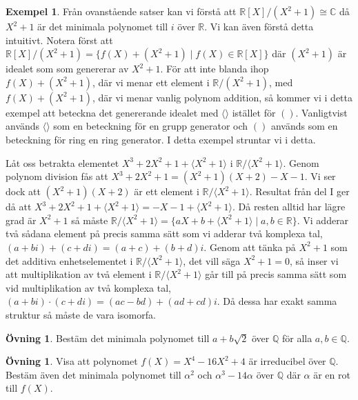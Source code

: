 \documentclass{article}
\theoremstyle{definition}
\newtheorem{ovning}[thm]{Övning}
\newtheorem{exmp}[thm]{Exempel}
\begin{document}
\begin{exmp}
  Från ovanstående satser kan vi förstå att $\mathbb{R}[X]/(X^2+1) \cong \mathbb{C}$ då $X^2 + 1$ är det minimala polynomet till $i$ över $\mathbb{R}$.
  Vi kan även förstå detta intuitivt. Notera först att $\mathbb{R}[X]/(X^2+1) = \{f(X) + (X^2 + 1) \; | \; f(X) \in \mathbb{R}[X]\}$
  där $(X^2 + 1)$ är idealet som som genererar av $X^2 + 1$. För att inte blanda ihop $f(X) + (X^2 + 1)$, där vi menar ett element i 
  $\mathbb{R}/(X^2 + 1)$, med $f(X) + (X^2 + 1)$, där vi menar vanlig polynom addition, så kommer vi 
  i detta exempel att beteckna det genererande idealet med $\langle \rangle$ istället för $()$. Vanligtvist används $\langle \rangle$
  som en beteckning för en grupp generator och $()$ används som en beteckning för ring en ring generator. I detta exempel 
  struntar vi i detta. 

  Låt oss betrakta elementet $X^3 + 2X^2 + 1 + \langle X^2 + 1 \rangle$ i $\mathbb{R}/ \langle X^2 + 1 \rangle$. Genom 
  polynom division fås att $X^3 + 2X^2 + 1 = (X^2 + 1)(X+2) - X -1$. Vi ser dock att $(X^2 + 1)(X + 2)$ är ett element i 
  $\mathbb{R}/ \langle X^2 + 1 \rangle$. Resultat från del I ger då att $X^3 + 2X^2 + 1 + \langle X^2 + 1 \rangle = -X -1 + \langle X^2 + 1 \rangle$.
  Då resten alltid har lägre grad är $X^2 +1$ så måste $\mathbb{R}/ \langle X^2 + 1 \rangle = \{aX + b +  \langle X^2 + 1 \rangle \; | \; a, b \in \mathbb{R} \}$.
  Vi adderar två sådana element på precis samma sätt som vi adderar två komplexa tal, $(a + bi) + (c + di) = (a+c)+(b+d)i$.
  Genom att tänka på $X^2 + 1$ som det additiva enhetselementet i $\mathbb{R}/ \langle X^2 + 1 \rangle$, det vill säga $X^2 + 1 = 0$, så 
  inser vi att multiplikation av två element i $\mathbb{R}/ \langle X^2 + 1 \rangle$ 
  går till på precis samma sätt som vid multiplikation av två komplexa tal, $(a + bi)\cdot (c+di) = (ac - bd) + (ad + cd)i$.
  Då dessa har exakt samma struktur så måste de vara isomorfa.
\end{exmp}

\begin{ovning}
  Bestäm det minimala polynomet till $a + b \sqrt{2}$ över $\mathbb{Q}$ för alla $a, b \in \mathbb{Q}$.
\end{ovning}

\begin{ovning}
  Visa att polynomet $f(X) = X^4 - 16X^2 + 4$ är irreducibel över $\mathbb{Q}$. Bestäm även det minimala polynomet till 
  $\alpha^2$ och $\alpha^3 - 14 \alpha$ över $\mathbb{Q}$ där $\alpha$ är en rot till $f(X)$.
\end{ovning}
\end{document}
